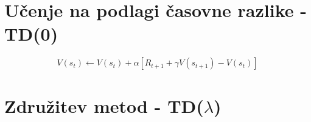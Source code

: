 \documentclass[a4paper, oneside, 12pt]{report}
\begin{document}


\section{Učenje na podlagi časovne razlike - TD(0)} \label{subsection:TD0Prediction} %
\begin{equation}
V(s_t) \gets V(s_t) + \alpha[R_{t+1} + \gamma V(s_{t+1}) - V(s_t)]
\end{equation}

\section{Združitev metod - TD($\lambda$)}





\end{document}

